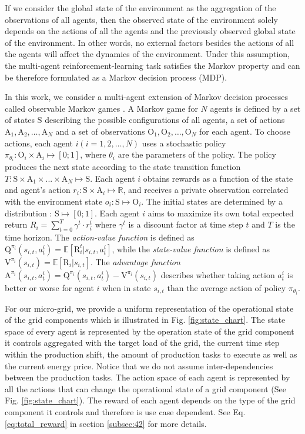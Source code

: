 If we consider the global state of the environment as the aggregation of the observations of all agents, then the observed state of the environment solely depends on the actions of all the agents and the previously observed global state of the environment. In other words, no external factors besides the actions of all the agents will affect the dynamics of the environment. Under this assumption, the multi-agent reinforcement-learning task satisfies the Markov property and can be therefore formulated as a Markov decision process (MDP).

In this work, we consider a multi-agent extension of Markov decision processes called observable Markov games \cite{Littman1994multiagent}. A Markov game for $N$ agents is defined by a set of states $\mathrm{S}$ describing the possible configurations of all agents, a set of actions $\mathrm{A}_1, \mathrm{A}_2, \ldots, \mathrm{A}_N$ and a set of observations $\mathrm{O}_1,\mathrm{O}_2, \ldots, \mathrm{O}_N$ for each agent. To choose actions, each agent $i ( i= 1,2,\ldots, N)$ uses a stochastic policy $\pi_{\theta_i} : \mathrm{O}_i \times \mathrm{A}_i \mapsto [0; 1]$, where $\theta_i$ are the parameters of the policy. The policy produces the next state according to the state transition function $T : \mathrm{S} \times  \mathrm{A}_1 \times ...  \times \mathrm{A}_N \mapsto \mathrm{S}$. Each agent $i$ obtains rewards as a function of the state and agent’s action $r_i : \mathrm{S} \times \mathrm{A}_i  \mapsto \mathbb{R}$, and receives a private observation correlated with the environment state $o_i : \mathrm{S} \mapsto \mathrm{O}_i$. The initial states are determined by a distribution  : $\mathrm{S} \mapsto [0; 1]$. Each agent $i$ aims to maximize its own total expected return $R_i = \sum_{t=0}^{T}{\gamma^t \cdot r_i^t}$ where $\gamma^t$ is a discount factor at time step $t$ and $T$ is the time horizon. The \textit{action-value function} is defined as $\mathrm{Q}^{\pi_i}(s_{i,t}, a_t^i)=\mathbb{E}[\mathrm{R}_i^t|s_{i,t},a_t^i]$, while the \textit{state-value function} is defined as $\mathrm{V}^{\pi_i}(s_{i,t})=\mathbb{E}[\mathrm{R}_i|s_{i,t}]$. The
\textit{advantage function} $\mathrm{A}^{\pi_i}(s_{i,t}, a_t^i) = \mathrm{Q}^{\pi_i}(s_{i,t}, a_t^i) - \mathrm{V}^{\pi_i}(s_{i,t})$ describes whether taking action $a_t^i$ is better or worse for agent $i$ when in state $s_{i,t}$ than the average action of policy $\pi_{\theta_i}$.

For our micro-grid, we provide a uniform representation of the operational state of the grid components which is illustrated in Fig. \ref{fig:state_chart}. The state space of every agent is represented by the operation state of the grid component it controls aggregated with the target load of the grid, the current  time step within  the production shift, the amount of production tasks to execute as well as the current energy price. Notice that we do not assume inter-dependencies between the production tasks. The action space of each agent is represented by all the actions that can change the operational state of a grid component (See Fig. \ref{fig:state_chart}). The reward of each agent depends on the type of the grid component it controls and therefore is use case dependent. See Eq. \ref{eq:total_reward} in section \ref{subsec:42} for more details.

